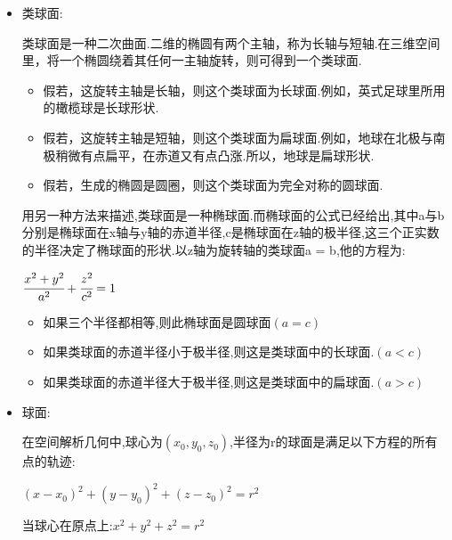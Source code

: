 {{{\begin{itemize}
{\begin{itemize}
{                      双叶抛物面在直角坐标系中的方程为:$\cfrac{x^2}{a^2} + \cfrac{y^2}{b^2} - \cfrac{z^2}{c^2} = -1$

                      当a = b时双曲面就会变得比较圆
                      }
                \item {
                      类球面:

                      类球面是一种二次曲面.二维的椭圆有两个主轴，称为长轴与短轴.在三维空间里，将一个椭圆绕着其任何一主轴旋转，则可得到一个类球面.

                      \begin{itemize}
                        \item 假若，这旋转主轴是长轴，则这个类球面为长球面.例如，英式足球里所用的橄榄球是长球形状.
                        \item 假若，这旋转主轴是短轴，则这个类球面为扁球面.例如，地球在北极与南极稍微有点扁平，在赤道又有点凸涨.所以，地球是扁球形状.
                        \item  假若，生成的椭圆是圆圈，则这个类球面为完全对称的圆球面.
                      \end{itemize}

                      用另一种方法来描述,类球面是一种椭球面.而椭球面的公式已经给出,其中a与b分别是椭球面在x轴与y轴的赤道半径,c是椭球面在z轴的极半径,这三个正实数的半径决定了椭球面的形状.以z轴为旋转轴的类球面a = b,他的方程为:

                      $\cfrac{x^2 + y^2}{a^2} + \cfrac{z^2}{c^2} = 1$

                      \begin{itemize}
                        \item 如果三个半径都相等,则此椭球面是圆球面$(a = c)$
                        \item 如果类球面的赤道半径小于极半径,则这是类球面中的长球面.$(a < c)$
                        \item 如果类球面的赤道半径大于极半径,则这是类球面中的扁球面.$(a > c)$
                      \end{itemize}
                      }
                \item {
                      球面:

                      在空间解析几何中,球心为$(x_0,y_0,z_0)$,半径为r的球面是满足以下方程的所有点的轨迹:

                      $(x - x_0)^2 + (y - y_0)^2 + (z - z_0)^2 = r^2$

                      当球心在原点上:$x^2 + y^2 + z^2 = r^2$

}
\end{itemize}}
\end{itemize}}}}

